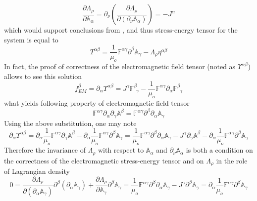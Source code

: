 \documentclass[aps,prx,preprint,groupedaddress,showkeys]{revtex4-2}
\begin{document}
\begin{equation} \label{CLASSLAGNEW}
\frac{\partial \Lambda_{\rho}} {\partial \mathbb{A}_{\alpha}} =  \partial_{\nu}  \left (  \frac{\partial \Lambda_{\rho}}{\partial (\partial_{\nu} \mathbb{A}_{\alpha} )}   \right ) = - J^{\alpha}
\end{equation}
which would support conclusions from \cite{ALL1}, and thus stress-energy tensor for the system is equal to
\begin{equation} \label{TensSep1}
T^{\alpha \beta} = \frac{1}{\mu_o}\mathbb{F}^{\alpha \gamma} \partial^{\beta} \mathbb{A}_{\gamma} -  \Lambda_{\rho} \eta^{\alpha \beta}
\end{equation}
In fact, the proof of correctness of the electromagnetic field tensor (noted as $\Upsilon^{\alpha \beta}$) allows to see this solution
\begin{equation} \label{Ups1}
f_{EM}^{\beta} = \partial_{\alpha} \Upsilon^{\alpha \beta} = J^{\gamma}\mathbb{F}^{\beta}_{\, \, \, \gamma} - \frac{1}{\mu_o}\mathbb{F}^{\alpha \gamma} \partial_{\alpha} \mathbb{F}^{\beta}_{\, \, \, \gamma}
\end{equation}
what yields following property of electromagnetic field tensor
\begin{equation} \label{Ups2}
\mathbb{F}^{\alpha \gamma} \partial_{\alpha} \partial_{\gamma} \mathbb{A}^{\beta} 
 = \mathbb{F}^{\alpha \gamma}  \partial^{\beta} \partial_{\alpha} \mathbb{A}_{\gamma} \end{equation}
Using the above substitution, one may note
\begin{equation} \label{TensorProof}
\partial_{\alpha} \Upsilon^{\alpha \beta} = \partial_{\alpha} \frac{1}{\mu_o} \mathbb{F}^{\alpha \gamma} \partial_{\gamma} \mathbb{A}^{\beta} - \partial_{\alpha} \frac{1}{\mu_o} \mathbb{F}^{\alpha \gamma} \partial^{\beta} \mathbb{A}_{\gamma} = \frac{1}{\mu_o} \mathbb{F}^{\alpha \gamma} \partial^{\beta} \partial_{\alpha} \mathbb{A}_{\gamma} - J^{\gamma}\partial_{\gamma} \mathbb{A}^{\beta} - \partial_{\alpha} \frac{1}{\mu_o} \mathbb{F}^{\alpha \gamma} \partial^{\beta} \mathbb{A}_{\gamma}
\end{equation}
Therefore the invariance of $\Lambda_{\rho}$ with respect to $\mathbb{A}_{\alpha}$ and  $\partial_{\nu} \mathbb{A}_{\alpha}$ is both a condition on the correctness of the electromagnetic stress-energy tensor and on $\Lambda_{\rho}$ in the role of Lagrangian density
\begin{equation} \label{TENSCORR}
0 = \frac{\partial \Lambda_{\rho}}{\partial (\partial_{\alpha} \mathbb{A}_{\gamma})} \partial^{\beta} (\partial_{\alpha} \mathbb{A}_{\gamma}) + \frac{\partial \Lambda_{\rho}} {\partial \mathbb{A}_{\gamma}} \partial^{\beta} \mathbb{A}_{\gamma} = \frac{1}{\mu_o} \mathbb{F}^{\alpha \gamma} \partial^{\beta} \partial_{\alpha} \mathbb{A}_{\gamma}  - J^{\gamma} \partial^{\beta} \mathbb{A}_{\gamma} = \partial_{\alpha} \frac{1}{\mu_o} \mathbb{F}^{\alpha \gamma} \partial^{\beta} \mathbb{A}_{\gamma}
\end{equation}
\end{document}
